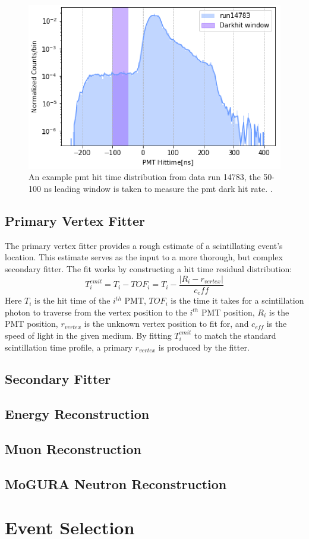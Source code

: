 \begin{figure}[htb]
	\centering
	\includegraphics[scale=0.4]{darkrate.png}
	\caption{An example pmt hit time distribution from data run 14783, the 50-100 ns leading window is taken to measure the pmt dark hit rate. \cite{li_phd}.}
	\label{fig:darkrate}
\end{figure}

\subsection{Primary Vertex Fitter}
The primary vertex fitter provides a rough estimate of a scintillating event's location. This estimate serves as the input to a more thorough, but complex secondary fitter. The fit works by constructing a hit time residual distribution:
\[T_{i}^{emit}=T_i-TOF_i = T_i - \frac{\left|R_i-r_{vertex}\right|}{c_eff}\]
Here $T_i$ is the hit time of the $i^{th}$ PMT, $TOF_i$ is the time it takes for a scintillation photon to traverse from the vertex position to the $i^{th}$ PMT position, $R_i$ is the PMT position, $r_{vertex}$ is the unknown vertex position to fit for, and $c_{eff}$ is the speed of light in the given medium. By fitting $T_i^{emit}$ to match the standard scintillation time profile, a primary $r_{vertex}$ is produced by the fitter.
\subsection{Secondary Fitter}
\subsection{Energy Reconstruction}
\subsection{Muon Reconstruction}
\subsection{MoGURA Neutron Reconstruction}
\section{Event Selection}


